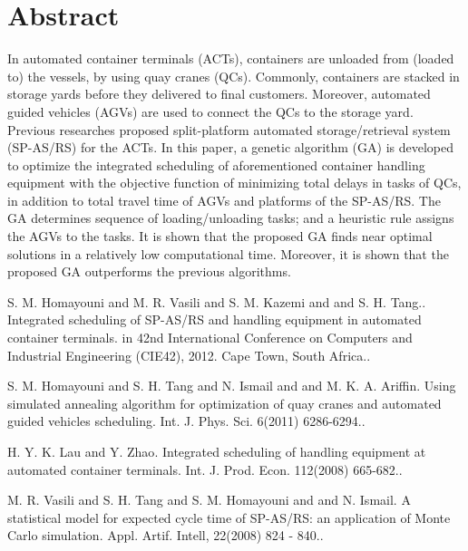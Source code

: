 \documentclass[article,A4,11pt]{llncs}%
\begin{document}
\section*{Abstract}
In automated container terminals (ACTs), containers are unloaded from (loaded to) the vessels, by using quay cranes (QCs). Commonly, containers are stacked in storage yards before they delivered to final customers. Moreover, automated guided vehicles (AGVs) are used to connect the QCs to the storage yard. Previous researches proposed split-platform automated storage/retrieval system (SP-AS/RS) for the ACTs. In this paper, a genetic algorithm (GA) is developed to optimize the integrated scheduling of aforementioned container handling equipment with the objective function of minimizing total delays in tasks of QCs, in addition to total travel time of AGVs and platforms of the SP-AS/RS. The GA determines sequence of loading/unloading tasks; and a heuristic rule assigns the AGVs to the tasks. It is shown that the proposed GA finds near optimal solutions in a relatively low computational time. Moreover, it is shown that the proposed GA outperforms the previous algorithms.


\begin{thebibliography}{10}
{\sc S. M. Homayouni and M. R. Vasili and S. M. Kazemi and and S. H. Tang.}. {Integrated scheduling of SP-AS/RS and handling equipment in automated container terminals}. in 42nd International Conference on Computers and Industrial Engineering (CIE42), 2012. Cape Town, South Africa..

{\sc S. M. Homayouni and S. H. Tang and N. Ismail and and M. K. A. Ariffin}. {Using simulated annealing algorithm for optimization of quay cranes and automated guided vehicles scheduling}. Int. J. Phys. Sci. 6(2011) 6286-6294..

{\sc H. Y. K. Lau and Y. Zhao}. {Integrated scheduling of handling equipment at automated container terminals}. Int. J. Prod. Econ. 112(2008) 665-682..

{\sc M. R. Vasili and S. H. Tang and S. M. Homayouni and and N. Ismail}. {A statistical model for expected cycle time of SP-AS/RS: an application of Monte Carlo simulation}. Appl. Artif. Intell, 22(2008) 824 - 840..
\end{thebibliography}
\end{document}
